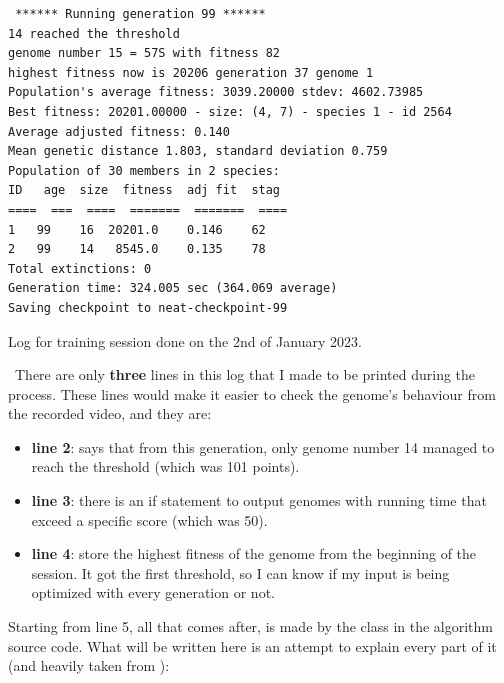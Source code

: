 \begin{listing}[H]
\begin{verbatim}
 ****** Running generation 99 ****** 
14 reached the threshold
genome number 15 = 57S with fitness 82
highest fitness now is 20206 generation 37 genome 1
Population's average fitness: 3039.20000 stdev: 4602.73985
Best fitness: 20201.00000 - size: (4, 7) - species 1 - id 2564
Average adjusted fitness: 0.140
Mean genetic distance 1.803, standard deviation 0.759
Population of 30 members in 2 species:
ID   age  size  fitness  adj fit  stag
====  ===  ====  =======  =======  ====
1   99    16  20201.0    0.146    62
2   99    14   8545.0    0.135    78
Total extinctions: 0
Generation time: 324.005 sec (364.069 average)
Saving checkpoint to neat-checkpoint-99
\end{verbatim}
\caption{Log for training session done on the 2nd of January 2023.}
\label{code:trainingSessionLog}
\end{listing}

 There are only \textbf{three} lines in this log that I made to be printed during the process. These lines would make it easier to check the genome's behaviour from the recorded video, and they are:
 \begin{itemize}
\item \textbf{line 2}: says that from this generation, only genome number 14 managed to reach the threshold (which was 101 points).
\item \textbf{line 3}: there is an if statement to output genomes with running time that exceed a specific score (which was 50).
\item \textbf{line 4}: store the highest fitness of the genome from the beginning of the session. It got the first threshold, so I can know if my input is being optimized with every generation or not.
 \end{itemize}

Starting from line 5, all that comes after, is made by the  class in the algorithm source code. What will be written here is an attempt to explain every part of it (and heavily taken from \cite{NEAT_Overview_-_Glossary}):



